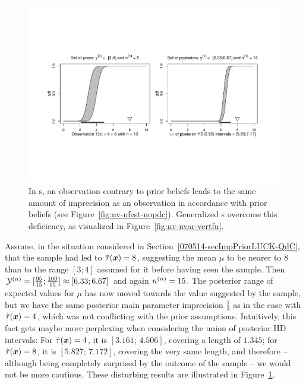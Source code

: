 \begin{figure}
\includegraphics[trim = 20mm 50mm 20mm 50mm, clip, width=\textwidth]{fig/jstp-paper_nv_nfest_02-080331}%
\caption[\ymodel\ for samples from $\norm(\mu,1)$: prior and posterior credal sets for data contrary to prior beliefs.]%
{In \ymodel s, an observation contrary to prior beliefs leads to
the same amount of imprecision as an observation in accordance with prior
beliefs (see Figure~\ref{fig:nv-nfest-nopdc}).  Generalized \ymodel s overcome this
deficiency, as visualized in Figure~\ref{fig:nv-nvar-vertfu}.}
\label{fig:nv-nfest-pdc}
\end{figure}

\begin{example}
\label{ex:jstp-5}
Assume, in the situation considered in Section~\ref{070514-secImpPriorLUCK-QdC},
that the sample had led to $\tilde{\tau}({\bm x}) = 8$,
suggesting the mean $\mu$ to be nearer to $8$ than to the range $[3;4]$ assumed
for it before having seen the sample.
Then $\mathcal{Y}^{(n)} = [\frac{95}{15} ; \frac{100}{15}] \approx [6.33 ; 6.67]$ and again
$n^{(n)} = 15$. The posterior range of expected values for $\mu$ has now moved
towards the value suggested by the sample, but we have the same
posterior main parameter imprecision $\frac{1}{3}$ as in the
case with $\tilde{\tau}({\bm x}) = 4$, which was not conflicting with the prior
assumptions. Intuitively, this fact gets maybe more perplexing when
considering the union of posterior HD intervals: For $\tilde{\tau}({\bm x}) = 4$,
it is $[3.161;\, 4.506]$, covering a length of $1.345$; for
$\tilde{\tau}({\bm x}) = 8$, it is $[5.827;\,7.172]$, covering the very same
length, and therefore -- although being completely surprised by the
outcome of the sample -- we would not be more cautious.
These disturbing results are illustrated in Figure~\ref{fig:nv-nfest-pdc}.
\end{example}

